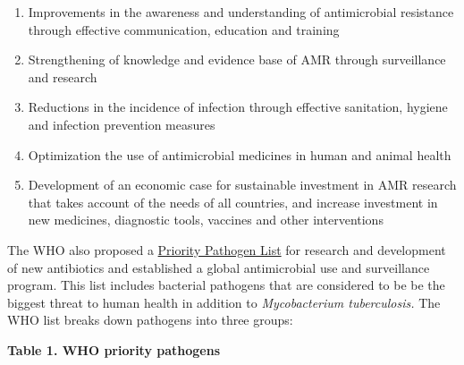 \documentclass[
]{book}
\providecommand{\tightlist}{%
  \setlength{\itemsep}{0pt}\setlength{\parskip}{0pt}}
\begin{document}
\begin{enumerate}
\def\labelenumi{\arabic{enumi}.}
\tightlist
\item
  Improvements in the awareness and understanding of antimicrobial resistance through effective communication, education and training
\item
  Strengthening of knowledge and evidence base of AMR through surveillance and research
\item
  Reductions in the incidence of infection through effective sanitation, hygiene and infection prevention measures
\item
  Optimization the use of antimicrobial medicines in human and animal health
\item
  Development of an economic case for sustainable investment in AMR research that takes account of the needs of all countries, and increase investment in new medicines, diagnostic tools, vaccines and other interventions
\end{enumerate}

The WHO also proposed a \href{https://www.who.int/medicines/publications/WHO-PPL-Short_Summary_25Feb-ET_NM_WHO.pdf}{Priority Pathogen List} for research and development of new antibiotics and established a global antimicrobial use and surveillance program. This list includes bacterial pathogens that are considered to be be the biggest threat to human health in addition to \emph{Mycobacterium tuberculosis.} The WHO list breaks down pathogens into three groups:

\textbf{Table 1. WHO priority pathogens}
\end{document}
